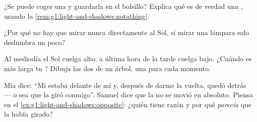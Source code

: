 \begin{exercise}[$\star$]\label{exo:g1:light-and-shadows:6}
¿Se puede coger una  y guardarla en el bolsillo? Explica qué
es de verdad una , usando la
\cref{rem:g1:light-and-shadows:notathing}.
\end{exercise}

\begin{exercise}[$\star$]\label{exo:g1:light-and-shadows:7}
¿Por qué no hay que mirar nunca directamente al Sol, si mirar una
lámpara solo deslumbra un poco?
\end{exercise}

\begin{exercise}[$\star$]\label{exo:g1:light-and-shadows:8}
Al mediodía el Sol cuelga alto; a última hora de la tarde cuelga bajo.
¿Cuándo es más larga tu ? Dibuja las dos  de un
árbol, una para cada momento.
\end{exercise}

\begin{exercise}[$\star\star$]\label{exo:g1:light-and-shadows:9}
Mía dice: ``Mi  estaba delante de mí y, después de darme la
vuelta, quedó detrás --- o sea que la  giró conmigo''. Samuel
dice que la  no se movió en absoluto. Piensa en el
\cref{ex:g1:light-and-shadows:opposite}: ¿quién tiene razón y por qué
\emph{parecía} que la  había girado?
\end{exercise}
